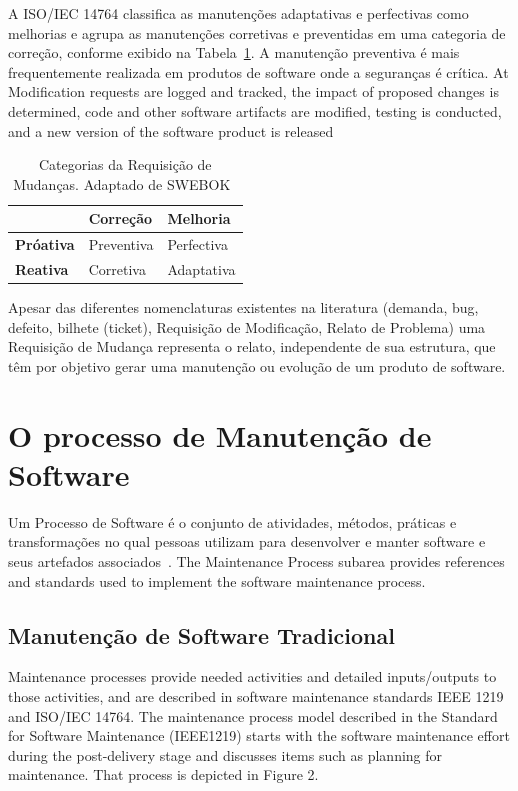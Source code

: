 A ISO/IEC 14764 classifica as manutenções adaptativas e perfectivas como melhorias e agrupa as
manutenções corretivas e preventidas em uma categoria de correção, conforme exibido na
Tabela~\ref{tab:categorias_requisicao_mudanca}. A manutenção preventiva é mais frequentemente
realizada em produtos de software onde a seguranças é crítica. At Modification requests are logged and tracked, the impact of proposed changes is determined, code and other software artifacts are modified, testing is conducted, and a new version of the software product is released

\begin{table}[htpb]

	\centering
	\caption{Categorias da Requisição de Mudanças. Adaptado de SWEBOK~\cite{4425813}}
	\label{tab:categorias_requisicao_mudanca}
	\begin{tabular}{l|l|l|}
		\cline{2-3}
	 & \textbf{Correção} & \textbf{Melhoria} \\ \hline
	 \multicolumn{1}{|l|}{\textbf{Próativa}} & Preventiva & Perfectiva \\ \hline
	 \multicolumn{1}{|l|}{\textbf{Reativa}} & Corretiva & Adaptativa \\ \hline
	\end{tabular}
 \end{table} 

Apesar das diferentes nomenclaturas existentes na literatura (demanda, bug, defeito, bilhete (ticket),
Requisição de Modificação, Relato de Problema) uma Requisição de Mudança representa o relato,
independente de sua estrutura, que têm por objetivo gerar uma manutenção ou evolução de um produto
de software. 
 
 \section{O processo de Manutenção de Software}
\label{sec:o_processo_de_manutecao_de_software}

Um Processo de Software é o conjunto de atividades, métodos, práticas e transformações no qual
pessoas utilizam para desenvolver e manter software e seus artefados associados~\cite{paulk1993key}. The Maintenance Process subarea provides references and standards used to implement the software
maintenance process.
\subsection{Manutenção de Software Tradicional}
\label{subsec:manutenção_de_software_tradicional}
Maintenance processes provide needed activities and
detailed inputs/outputs to those activities, and are described in software maintenance standards
IEEE 1219 and ISO/IEC 14764.
The maintenance process model described in the Standard for Software Maintenance (IEEE1219) starts
with the software maintenance effort during the post-delivery stage and discusses items such as
planning for maintenance. That process is depicted in Figure 2.

